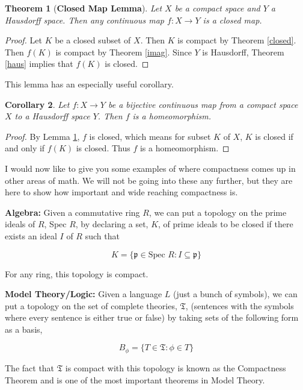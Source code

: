 \documentclass[a4paper]{article}
\newtheorem{theorem}{Theorem}
\newtheorem{corollary}[theorem]{Corollary}
\numberwithin{theorem}{section}
\begin{document}
\begin{theorem}[\textbf{Closed Map Lemma}] \label{cml}
Let $X$ be a compact space and $Y$ a Hausdorff space. Then any continuous map $f: X \rightarrow Y$ is a closed map.
\end{theorem}

\begin{proof}
Let $K$ be a closed subset of $X$. Then $K$ is compact by Theorem \ref{closed}. Then $f(K)$ is compact by Theorem \ref{imag}. Since $Y$ is Hausdorff, Theorem \ref{haus} implies that $f(K)$ is closed.
\end{proof}

This lemma has an especially useful corollary.

\begin{corollary}
Let $f: X \rightarrow Y$ be a bijective continuous map from a compact space $X$ to a Hausdorff space $Y$. Then $f$ is a homeomorphism.
\end{corollary}

\begin{proof}
By Lemma \ref{cml}, $f$ is closed, which means for subset $K$ of $X$, $K$ is closed if and only if $f(K)$ is closed. Thus $f$ is a homeomorphism.
\end{proof}

I would now like to give you some examples of where compactness comes up in other areas of math. We will not be going into these any further, but they are here to show how important and wide reaching compactness is.

\textbf{Algebra:} Given a commutative ring $R$, we can put a topology on the prime ideals of $R$, Spec $R$, by declaring a set, $K$, of prime ideals to be closed if there exists an ideal $I$ of $R$ such that

$$ K = \{\mathfrak{p} \in \text{Spec } R : I \subseteq \mathfrak{p } \} $$

For any ring, this topology is compact.

\textbf{Model Theory/Logic:} Given a language $L$ (just a bunch of symbols), we can put a topology on the set of complete theories, $\mathfrak{T}$, (sentences with the symbols where every sentence is either true or false) by taking sets of the following form as a basis,

$$ B_\phi = \{ T \in \mathfrak{T} : \phi \in T \} $$

The fact that $\mathfrak{T}$ is compact with this topology is known as the Compactness Theorem and is one of the most important theorems in Model Theory.
\end{document}
